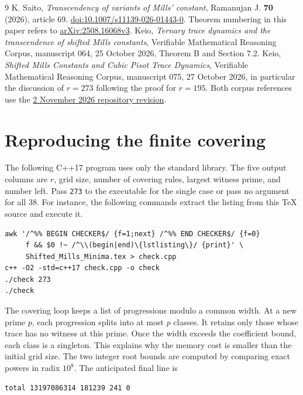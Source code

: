 \documentclass[11pt]{article}
\begin{document}
\begin{thebibliography}{9}
 K. Saito, \emph{Transcendency of variants of Mills' constant},
Ramanujan J. \textbf{70} (2026), article 69.
\href{https://doi.org/10.1007/s11139-026-01443-0}{doi:10.1007/s11139-026-01443-0}.
Theorem numbering in this paper refers to
\href{https://arxiv.org/html/2508.16068v3}{arXiv:2508.16068v3}.
 Keio, \emph{Ternary trace dynamics and the transcendence of shifted
Mills constants}, Verifiable Mathematical Reasoning Corpus, manuscript 064,
25 October 2026, Theorem B and Section 7.2.
 Keio, \emph{Shifted Mills Constants and Cubic Pisot Trace Dynamics},
Verifiable Mathematical Reasoning Corpus, manuscript 075, 27 October 2026,
in particular the discussion of $r=273$ following the proof for $r=195$.
Both corpus references use the
\href{https://github.com/QEEDDD/Verifiable-Mathematical-Reasoning-Corpus/tree/ecd87de3348dcb706a76bb12fde722d7a348a012}{2 November 2026 repository revision}.
\end{thebibliography}

\appendix
\section{Reproducing the finite covering}\label{app:code}
The following C++17 program uses only the standard library. The five
output columns are $r$, grid size, number of covering rules, largest
witness prime, and number left. Pass
\texttt{273} to the executable for the single case or pass no argument
for all 38. For instance, the following commands extract the listing
from this TeX source and execute it.
\begin{verbatim}
awk '/^%% BEGIN CHECKER$/ {f=1;next} /^%% END CHECKER$/ {f=0}
     f && $0 !~ /^\\(begin|end)\{lstlisting\}/ {print}' \
     Shifted_Mills_Minima.tex > check.cpp
c++ -O2 -std=c++17 check.cpp -o check
./check 273
./check
\end{verbatim}
The covering loop keeps a list of progressions modulo a common width.
At a new prime $p$, each progression splits into at most $p$ classes.
It retains only those whose trace has no witness at this prime. Once
the width exceeds the coefficient bound, each class is a singleton.
This explains why the memory cost is smaller than the initial grid size.
The two integer root bounds are computed by comparing exact powers in
radix $10^8$. The anticipated final line is
\begin{verbatim}
total 13197086314 181239 241 0
\end{verbatim}
\end{document}
